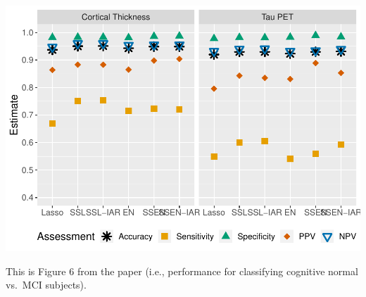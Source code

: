 \documentclass[
]{article}
\begin{document}
\includegraphics{analysis_details_files/figure-latex/unnamed-chunk-34-1.pdf}

This is Figure 6 from the paper (i.e., performance for classifying
cognitive normal vs.~MCI subjects).
\end{document}
